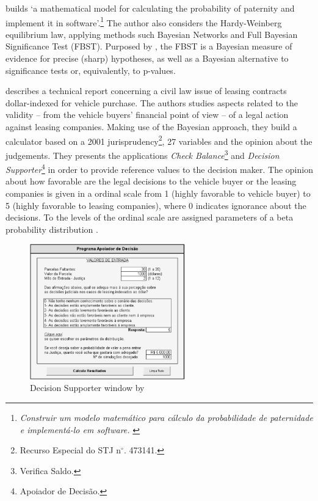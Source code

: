 \documentclass[a4paper]{exam}
\theoremstyle{plain}
\begin{document}
\cite{nakano2006novel} builds `a mathematical model for calculating the probability of paternity and implement it in software'.\footnote{\textit{Construir um modelo matemático para cálculo da probabilidade de paternidade e implementá-lo em software.} \cite[p. 5]{nakano2006novel}} The author also considers the Hardy-Weinberg equilibrium law, applying methods such Bayesian Networks and Full Bayesian Significance Test (FBST). Purposed by \cite{pereira1999evidence}, the FBST is a Bayesian measure of evidence for precise (sharp) hypotheses, as well as a Bayesian alternative to significance tests or, equivalently, to p-values.

\cite{wechsler2006analise} describes a technical report concerning a civil law issue of leasing contracts dollar-indexed for vehicle purchase. The authors studies aspects related to the validity -- from the vehicle buyers' financial point of view -- of a legal action against leasing companies. Making use of the Bayesian approach, they build a calculator based on a 2001 jurisprudency\footnote{Recurso Especial do STJ n$^{\circ}$. 473141.}, 27 variables and the opinion about the judgements. They presents the applications \textit{Check Balance}\footnote{Verifica Saldo.} and \textit{Decision Supporter}\footnote{Apoiador de Decisão.} in order to provide reference values to the decision maker. The opinion about how favorable are the legal decisions to the vehicle buyer or the leasing companies is given in a ordinal scale from 1 (highly favorable to vehicle buyer) to 5 (highly favorable to leasing companies), where 0 indicates ignorance about the decisions. To the levels of the ordinal scale are assigned parameters of a beta probability distribution \cite[pp. 210-275]{johnson1995continuous}.

\begin{figure}[!h]
  \begin{center}
    \includegraphics[width=0.6\textwidth]{adgray.png}
  \caption{Decision Supporter window by \cite[p. 49]{wechsler2006analise}}
  \label{fig:bayes}
  \end{center}
\end{figure}
\end{document}
